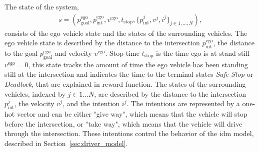 	The state of the system,
	\begin{align}
		s = (p^\mathrm{ego}_\mathrm{goal},p^\mathrm{ego}_\mathrm{int}, v^\mathrm{ego}, t_\mathrm{stop}, \{p^{j}_\mathrm{int}, v^j, i^j\}_{j\in 1,\dots,N}),
		\label{eq:state}
	\end{align}
	consists of the ego vehicle state and the states of the surrounding vehicles. The ego vehicle state is described by the distance to the intersection $p^\mathrm{ego}_\mathrm{int}$, the distance to the goal $p^\mathrm{ego}_\mathrm{goal}$ and velocity $v^\mathrm{ego}$. Stop time $t_\mathrm{stop}$ is the time ego is at stand still  $v^\mathrm{ego}=0$, this state tracks the amount of time the ego vehicle has been standing still at the intersection and indicates the time to the terminal states \textit{Safe Stop} or \textit{Deadlock}, that are explained in reward function. The states of the surrounding vehicles, indexed by $j \in 1 \ldots N$, are described by the distance to the intersection $p^{j}_\mathrm{int}$, the velocity $v^j$, and the intention $i^j$. The intentions are represented by a one-hot vector and can be either "give way", which means that the vehicle will stop before the intersection, or "take way", which means that the vehicle will drive through the intersection. These intentions control the behavior of the \gls{idm} model, described in Section~\ref{sec:driver_model}.
	
	
	
	

